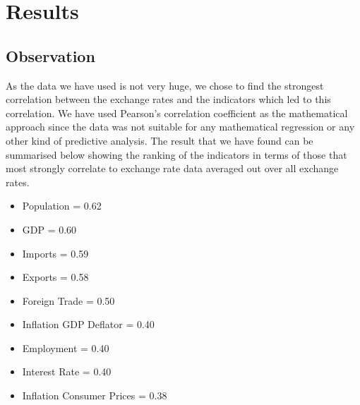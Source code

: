 \section{Results}
\subsection{Observation}
As the data we have used is not very huge, we chose to find the strongest correlation between the exchange rates and the indicators which led to this correlation. We have used Pearson's correlation coefficient as the mathematical approach since the data was not suitable for any mathematical regression or any other kind of predictive analysis. The result that we have found can be summarised below showing the ranking of the indicators in terms of those that most strongly correlate to exchange rate data averaged out over all exchange rates.
\newline
\begin{itemize}
\item Population = 0.62
\item GDP = 0.60
\item Imports = 0.59
\item Exports = 0.58
\item Foreign Trade = 0.50
\item Inflation GDP Deflator = 0.40
\item Employment = 0.40
\item Interest Rate = 0.40
\item Inflation Consumer Prices = 0.38
\end{itemize}

